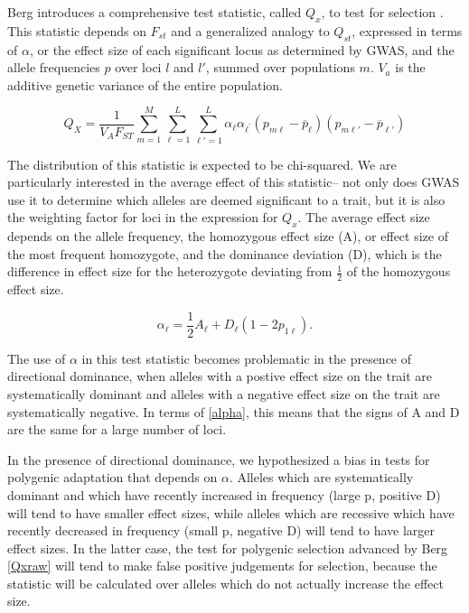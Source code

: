 \documentclass[a4paper,11pt]{article}
\begin{document}
Berg introduces a comprehensive test statistic, called $Q_x$, to test
for selection \cite{berg}. This statistic depends on $F_{st}$ and
a generalized analogy to $Q_{st}$, expressed in terms of $\alpha$, or
the effect size of each significant locus as determined by GWAS, and
the allele frequencies $p$ over loci $l$ and $l'$, summed over
populations $m$. $V_a$ is the additive genetic variance of the entire population.

\begin{equation} \label{Qxraw}
  Q_X = \frac{1}{V_A F_{ST}} \sum_{m=1}^M \sum_{\ell=1}^L \sum_{\ell\prime=1}^L \alpha_{\ell} \alpha_{\ell^{\prime}}\left(p_{m\ell} - \overline{p}_\ell \right)\left(p_{m \ell\prime} - \overline{p}_{\ell\prime}\right)
\end{equation}

The distribution of this statistic is expected to be chi-squared. We are particularly interested in the average effect of this
statistic-- not only does GWAS use it to determine which alleles are deemed
significant to a trait, but it is also the weighting factor for loci in the
expression for $Q_x$. The average effect size depends on the allele
frequency, the homozygous effect size (A), or effect size of the most frequent homozygote, and the
dominance deviation (D), which is the difference in effect size for the heterozygote
deviating from $\frac{1}{2}$ of the homozygous effect size.

\begin{equation}  
  \alpha_\ell = \frac{1}{2} A_\ell + D_\ell\left(1-2p_{1\ell}\right).
  \label{alpha}
\end{equation}

The use of $\alpha$ in this test statistic becomes problematic in the
presence of directional dominance, when alleles with a postive effect
size on the trait are systematically dominant and alleles with a
negative effect size on the trait are systematically negative. In
terms of \eqref{alpha}, this means that the signs of A and D are the
same for a large number of loci.

In the presence of directional dominance, we hypothesized a bias in
tests for polygenic adaptation that depends on $\alpha$. Alleles which
are systematically dominant and which have recently increased in
frequency (large p, positive D) will tend to have smaller effect sizes, while
alleles which are recessive which have recently decreased in frequency
(small p, negative D) will tend to have larger effect sizes. In the
latter case, the test for polygenic selection advanced by Berg
\eqref{Qxraw} will tend to make false positive judgements for
selection, because the statistic will be calculated over alleles which
do not actually increase the effect size.
\end{document}
